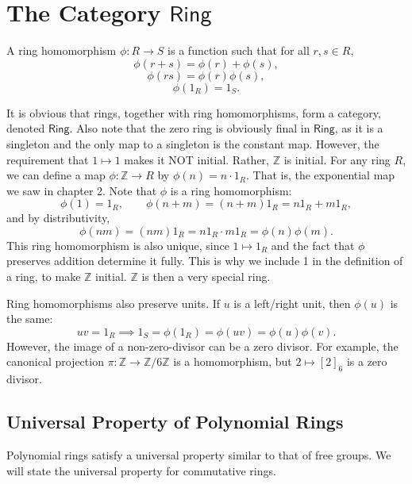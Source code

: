 \section{The Category $\mathsf{Ring}$}
\begin{definition}\label{dfn:3.2.1}
	A ring homomorphism $\phi : R \to S$ is a function such that for all $r,s\in R$,
	\[
		\phi (r+s)=\phi (r)+\phi (s)
	,\]
	\[
		\phi (rs)=\phi (r)\phi (s)
	,\]
	\[
		\phi (1_R)=1_S
	.\]
\end{definition}
It is obvious that rings, together with ring homomorphisms, form a category, denoted $\mathsf{Ring}$. Also note that the zero ring is obviously final in $\mathsf{Ring}$, as it is a singleton and the only map to a singleton is the constant map. However, the requirement that $1\mapsto 1$ makes it NOT initial. Rather, $\mathbb{Z}$ is initial. For any ring $R$, we can define a map $\phi : \mathbb{Z} \to R$ by $\phi (n)=n\cdot 1_R$. That is, the exponential map we saw in chapter 2. Note that $\phi $ is a ring homomorphism:
\[
	\phi (1)=1_R,\qquad \phi (n+m)=(n+m)1_R = n1_R + m1_R
,\]
and by distributivity,
\[
	\phi (nm)=(nm)1_R=n1_R \cdot m1_R=\phi (n)\phi (m)
.\]
This ring homomorphism is also unique, since $1\mapsto 1_R$ and the fact that $\phi $ preserves addition determine it fully. This is why we include 1 in the definition of a ring, to make $\mathbb{Z}$ initial. $\mathbb{Z}$ is then a very special ring.

Ring homomorphisms also preserve units. If $u$ is a left/right unit, then $\phi (u)$ is the same:
\[
	uv=1_R \implies 1_S=\phi (1_R)=\phi (uv)=\phi (u)\phi (v)
.\]
However, the image of a non-zero-divisor can be a zero divisor. For example, the canonical projection $\pi : \mathbb{Z} \to \mathbb{Z}/6\mathbb{Z}$ is a homomorphism, but $2\mapsto [2]_6$ is a zero divisor.

\subsection{Universal Property of Polynomial Rings}
Polynomial rings satisfy a universal property similar to that of free groups. We will state the universal property for commutative rings.

